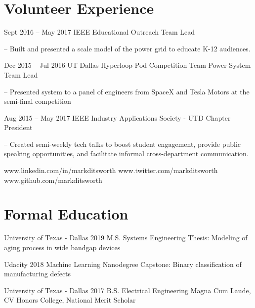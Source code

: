 \documentclass{tccv}
\begin{document}
\section{Volunteer Experience}

\begin{eventlist}
	\item{Sept 2016 -- May 2017}
	{IEEE Educational Outreach}
	{Team Lead}
	
-- Built and presented a scale model of the power grid to educate K-12 audiences. 
	
	\item{Dec 2015 -- Jul 2016}
	{UT Dallas Hyperloop Pod Competition Team}
	{Power System Team Lead}

-- Presented system to a panel of engineers from SpaceX and Tesla Motors at the semi-final competition

	\item{Aug 2015 -- May 2017}
	{IEEE Industry Applications Society - UTD Chapter}
	{President}

-- Created semi-weekly tech talks to boost student engagement, provide public speaking opportunities, and facilitate informal cross-department communication.
\end{eventlist}

    {www.linkedin.com/in/markditsworth}
    {www.twitter.com/markditsworth}
    {www.github.com/markditsworth}

\section{Formal Education}

\begin{yearlist} 

\item[University of Texas - Dallas]{2019}
     {M.S. Systems Engineering}
     {Thesis: Modeling of aging process in wide bandgap devices}

\item[Udacity]{2018}
	 {Machine Learning Nanodegree}
	 {Capstone: Binary classification of manufacturing defects}

\item[University of Texas - Dallas]{2017}
     {B.S. Electrical Engineering}
     {Magna Cum Laude, CV Honors College, National Merit Scholar}

\end{yearlist}
\vspace{-20pt}
\end{document}
